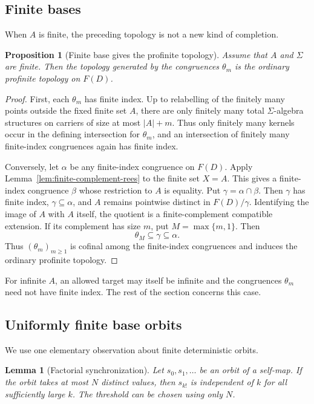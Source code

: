 \documentclass{birkau}
\newtheorem{proposition}[theorem]{Proposition}
\newtheorem{lemma}[theorem]{Lemma}
\theoremstyle{definition}
\theoremstyle{remark}
\begin{document}
\subsection{Finite bases}

When $A$ is finite, the preceding topology is not a new kind of completion.

\begin{proposition}[Finite base gives the profinite topology]
\label{prop:finite-base-profinite}
Assume that $A$ and $\Sigma$ are finite.  Then the topology generated by the
congruences $\theta_m$ is the ordinary profinite topology on $F(D)$.
\end{proposition}

\begin{proof}
First, each $\theta_m$ has finite index.  Up to relabelling of the finitely many
points outside the fixed finite set $A$, there are only finitely many total
$\Sigma$-algebra structures on carriers of size at most $|A|+m$.  Thus only
finitely many kernels occur in the defining intersection for $\theta_m$, and
an intersection of finitely many finite-index congruences again has finite
index.

Conversely, let $\alpha$ be any finite-index congruence on $F(D)$.  Apply
Lemma~\ref{lem:finite-complement-rees} to the finite set $X=A$.  This gives a
finite-index congruence $\beta$ whose restriction to $A$ is equality.  Put
$\gamma=\alpha\cap\beta$.  Then $\gamma$ has finite index,
$\gamma\subseteq\alpha$, and $A$ remains pointwise distinct in
$F(D)/\gamma$.  Identifying the image of $A$ with $A$ itself, the quotient is a
finite-complement compatible extension.  If its complement has size $m$, put
$M=\max\{m,1\}$.  Then
\[
 \theta_M\subseteq\gamma\subseteq\alpha.
\]
Thus $(\theta_m)_{m\ge1}$ is cofinal among the finite-index congruences and
induces the ordinary profinite topology.
\end{proof}

For infinite $A$, an allowed target may itself be infinite and the congruences
$\theta_m$ need not have finite index.  The rest of the section concerns this
case.

\subsection{Uniformly finite base orbits}

We use one elementary observation about finite deterministic orbits.

\begin{lemma}[Factorial synchronization]\label{lem:finite-orbit-factorials}
Let $s_0,s_1,\ldots$ be an orbit of a self-map.  If the orbit takes at most
$N$ distinct values, then $s_{k!}$ is independent of $k$ for all sufficiently
large $k$.  The threshold can be chosen using only $N$.
\end{lemma}
\end{document}

